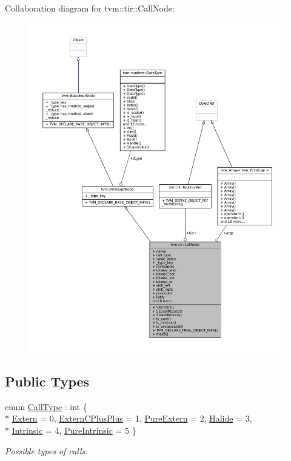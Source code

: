 Collaboration diagram for tvm\+:\+:tir\+:\+:Call\+Node\+:
\nopagebreak
\begin{figure}[H]
\begin{center}
\leavevmode
\includegraphics[width=350pt]{classtvm_1_1tir_1_1CallNode__coll__graph}
\end{center}
\end{figure}
\subsection*{Public Types}
\begin{DoxyCompactItemize}
\item 
enum \hyperlink{classtvm_1_1tir_1_1CallNode_a13e1f0f48f488fd085ca2684738fa97a}{Call\+Type} \+: int \{ \\*
\hyperlink{classtvm_1_1tir_1_1CallNode_a13e1f0f48f488fd085ca2684738fa97aab7045868cb47d7cb16471faab2a04af4}{Extern} = 0, 
\hyperlink{classtvm_1_1tir_1_1CallNode_a13e1f0f48f488fd085ca2684738fa97aae9b7420c5efa76da58ce83ea64c47a5d}{Extern\+C\+Plus\+Plus} = 1, 
\hyperlink{classtvm_1_1tir_1_1CallNode_a13e1f0f48f488fd085ca2684738fa97aa28d0e2a1d6e2553b9c0c70151efb9927}{Pure\+Extern} = 2, 
\hyperlink{classtvm_1_1tir_1_1CallNode_a13e1f0f48f488fd085ca2684738fa97aa57993161c871dc15a052154594845514}{Halide} = 3, 
\\*
\hyperlink{classtvm_1_1tir_1_1CallNode_a13e1f0f48f488fd085ca2684738fa97aa53257cce64e712a51504dc56287f9bce}{Intrinsic} = 4, 
\hyperlink{classtvm_1_1tir_1_1CallNode_a13e1f0f48f488fd085ca2684738fa97aa2403c0f0c0f7bef7f60d06918d8d39ac}{Pure\+Intrinsic} = 5
 \}\begin{DoxyCompactList}\small\item\em Possible types of calls. \end{DoxyCompactList}
\end{DoxyCompactItemize}
